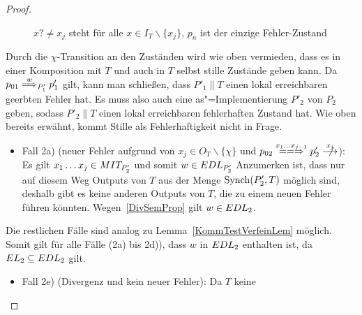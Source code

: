 \begin{proof}
\begin{itemize}
\begin{figure} [h!tbp]
\begin{center}
        \caption{$x?\neq x_j$ steht für alle $x\in I_T\backslash\{x_j\}$, $p_n$
          ist der einzige Fehler-Zustand}
      \label{TmitEundO}
      \end{center}
      \end{figure}
      Durch die $\chi$-Transition an den Zuständen wird wie oben vermieden,
      dass es in einer Komposition mit $T$ und auch in $T$ selbst
      stille Zustände geben kann. Da $p_{01} \weakmust[w]_{P'_1} p'_1$ gilt,
      kann man schließen, dass $P'_1\|T$ einen lokal erreichbaren geerbten
      Fehler hat. Es muss also auch eine as"=Implementierung $P'_2$ von $P_2$
      geben, sodass $P'_2\|T$ einen lokal erreichbaren fehlerhaften Zustand
      hat. Wie oben bereits erwähnt, kommt Stille als Fehlerhaftigkeit nicht in
      Frage.
      \begin{itemize}
        \item Fall 2a) \big(neuer Fehler aufgrund von $x_j\in O_T\backslash
          \{\chi\}$ und $p_{02} \lweakmay[x_1\dots x_{j-1}] p'_2
          \nmust[x_j]$\big): Es gilt $x_1\dots x_j\in MIT _{P'_2}$ und somit
          $w\in EDL _{P'_2}$ Anzumerken ist, dass nur auf diesem Weg Outputs
          von $T$ aus der Menge $\mathrm{Synch} (P'_2,T)$ möglich sind, deshalb gibt es
          keine anderen Outputs von $T$, die zu einem neuen Fehler führen
          könnten. Wegen~\ref{DivSemProp} gilt $w\in EDL _2$.
      \end{itemize}
      Die restlichen Fälle sind analog zu Lemma~\ref{KommTestVerfeinLem}
      möglich. Somit gilt für alle Fälle (2a) bis 2d)), dass $w$ in $EDL _2$
      enthalten ist, da $EL _2\subseteq EDL _2$ gilt.
      \begin{itemize}
        \item Fall 2e) (Divergenz und kein neuer Fehler): Da $T$ keine

\end{itemize}
\end{itemize}
\end{proof}

